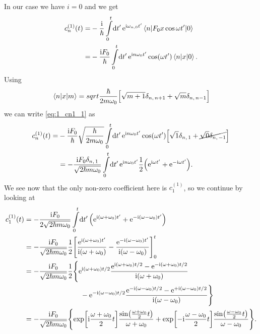 \documentclass[11pt,letter, swedish, english
]{article}
\begin{document}
In our case we have $i=0$ and we get
\begin{equation}\label{eq:1_cn1_1}
\begin{aligned}
c_n^{(1)}(t)=&-\frac{\ii}{\hbar}
\int_0^t\!\rd{t'} \,\ee^{\ii\omega_{n,0}t'}
\mel{n}{F_0x\cos\omega t'}{0}\\
=&-\frac{\ii F_0}{\hbar}
\int_0^t\!\rd{t'} \,\ee^{\ii n\omega_{0}t'}
\cos(\omega t')\mel{n}{x}{0}.
\end{aligned}
\end{equation}
Using
\begin{equation}\label{eq:1_mel_x}
\mel{n}{x}{m}=sqrt{\frac{\hbar}{2m\omega_0}}
\Big[ \sqrt{m+1}\delta_{n,\,n+1}+\sqrt{m}\delta_{n,\,n-1}
\Big]
\end{equation}
we can write \eqref{eq:1_cn1_1} as
\begin{equation}\label{eq:1_cn1_2}
\begin{aligned}
c_n^{(1)}(t)=&-\frac{\ii F_0}{\hbar}\sqrt{\frac{\hbar}{2m\omega_0}}
\int_0^t\!\rd{t'} \,\ee^{\ii n\omega_{0}t'}
\cos(\omega t')\Big[ 
\sqrt{1}\delta_{n,\,1}+\cancel{\sqrt{0}\delta_{n,\,-1}}\Big]\\
&=-\frac{\ii F_0 \delta_{n,\,1}}{\sqrt{2\hbar m\omega_0}}
\int_0^t\!\rd{t'} \,\ee^{\ii n\omega_{0}t'}
\frac{1}{2}\qty(\ee^{\ii \omega t'}+\ee^{-\ii \omega t'}).
\end{aligned}
\end{equation}
We see now that the only non-zero coefficient here is $c_1^{(1)}$, so
we continue by looking at
\begin{equation}\label{eq:1_cn1_3}
\begin{aligned}
c_1^{(1)}(t)&=-\frac{\ii F_0 }{2\sqrt{2\hbar m\omega_0}}
\int_0^t\!\rd{t'} \,
\qty(\ee^{\ii(\omega+\omega_0)t'}+\ee^{-\ii(\omega-\omega_0)t'})\\
&=-\frac{\ii F_0}{\sqrt{2\hbar m\omega_0}}\frac{1}{2}
\qty[\frac{\ee^{\ii(\omega+\omega_0)t'}}{\ii(\omega+\omega_0)}
-\frac{\ee^{-\ii(\omega-\omega_0)t'}}{\ii(\omega-\omega_0)}]_0^t\\
&=-\frac{\ii F_0}{\sqrt{2\hbar m\omega_0}}\frac{1}{2}
\Bigg\{\ee^{\ii(\omega+\omega_0)t/2}\frac{\ee^{\ii(\omega+\omega_0)t/2}
-\ee^{-\ii(\omega+\omega_0)t/2}}{\ii(\omega+\omega_0)}
\\ & \hspace{80pt}
-\ee^{-\ii(\omega-\omega_0)t/2}\frac{\ee^{-\ii(\omega-\omega_0)t/2}
-\ee^{+\ii(\omega-\omega_0)t/2}}{\ii(\omega-\omega_0)}
\Bigg\}\\
&=-\frac{\ii F_0}{\sqrt{2\hbar m\omega_0}}
\qty{
\exp[\ii\frac{\omega+\omega_0}{2}t]\frac{\sin(\frac{\omega+\omega_0}{2}t)}
{\omega+\omega_0}
+\exp[-\ii\frac{\omega-\omega_0}{2}t]\frac{\sin(\frac{\omega-\omega_0}{2}t)}
{\omega-\omega_0}
}.
\end{aligned}
\end{equation}
\end{document}
